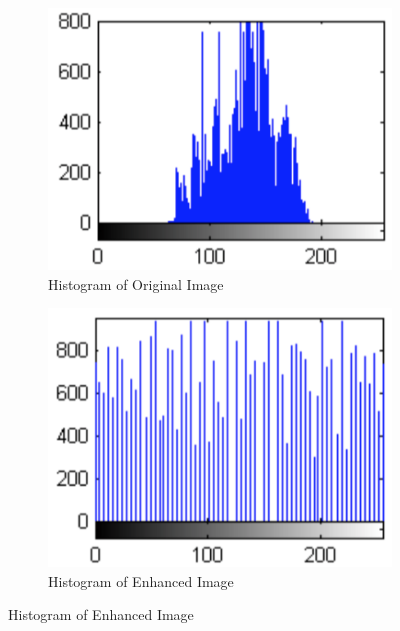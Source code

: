 \begin{figure}
\centering
\begin{subfigure}{.5\textwidth}
  \centering
  \includegraphics[width=.5\linewidth]{Figures/Figure5}
  \caption{Histogram of Original Image}
  \label{fig:sub3}
\end{subfigure}%
\begin{subfigure}{.5\textwidth}
  \centering
  \includegraphics[width=.5\linewidth]{Figures/Figure6}
  \caption{Histogram of Enhanced Image}
  \label{fig:sub4}
\end{subfigure}
\caption{Histogram of Enhanced Image}
\label{fig:test2}
\end{figure}

